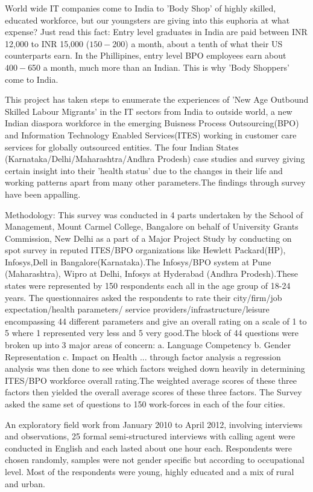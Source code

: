World wide IT companies come to India to 'Body Shop' of highly skilled, educated workforce, but our youngsters are giving into this euphoria at what expense? Just read this fact: Entry level graduates in India are paid between INR 12,000 to INR 15,000 ($150-$200) a month, about a tenth of what their US counterparts earn. In the Phillipines, entry level BPO employees earn about $400- $650 a month, much more than an Indian. This is why 'Body Shoppers' come to India.



This project has taken steps to enumerate the experiences of 'New Age Outbound Skilled Labour Migrants' in the IT sectors from India to outside world, a new Indian diaspora  workforce in the emerging Buisness Process Outsourcing(BPO) and Information Technology Enabled Services(ITES) working in customer care services for globally outsourced entities. The four Indian States (Karnataka/Delhi/Maharashtra/Andhra Prodesh) case studies and survey giving certain insight into their 'health status' due to the changes in their life and working patterns apart from many other parameters.The findings through survey have been appalling.

Methodology:
This survey was conducted in 4 parts undertaken by the School of Management, Mount Carmel College, Bangalore on behalf of University Grants Commission, New Delhi as a part of a Major  Project Study by conducting on spot survey in reputed ITES/BPO organizations like Hewlett Packard(HP), Infosys,Dell in Bangalore(Karnataka).The Infosys/BPO system at Pune (Maharashtra), Wipro at Delhi, Infosys at Hyderabad (Andhra Prodesh).These states were represented by 150 respondents each all in the age group of 18-24 years. The questionnaires asked the respondents to rate their city/firm/job expectation/health parameters/ service providers/infrastructure/leisure encompassing 44 different parameters and give an overall rating on a scale of 1 to 5 where 1 represented very less and 5 very good.The block of 44 questions were broken up into 3 major areas of concern:
a. Language Competency
b. Gender Representation
c. Impact on Health
... through factor analysis a regression analysis was then done to see which factors weighed down heavily in determining ITES/BPO workforce overall rating.The weighted average scores of these three factors then yielded the overall average scores of these three factors. The Survey asked the same set of questions to 150 work-forces in each of the four cities.

An exploratory field work  from January 2010 to April 2012, involving interviews and observations, 25 formal semi-structured interviews with calling agent were conducted in English and each lasted about one hour each. Respondents were chosen randomly, samples were not gender specific but according to occupational level. Most of the respondents were young, highly educated and a mix of rural and urban.

